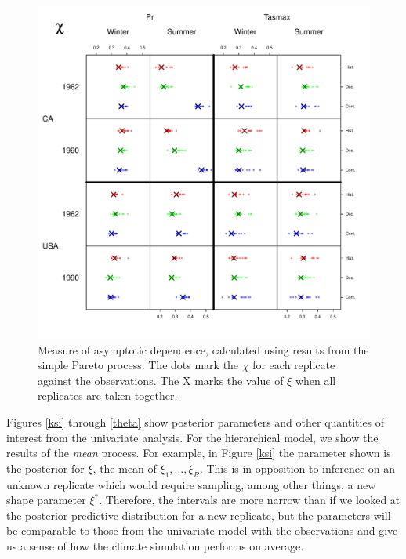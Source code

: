 \begin{figure}
\begin{center}
\includegraphics[scale=0.72]{figs/chi4.pdf}
\end{center}
\caption{Measure of asymptotic dependence, calculated using results from the simple Pareto process. The dots mark the $\chi$ for each replicate against the observations. The X marks the value of $\xi$ when all replicates are taken together.}
\label{chi}
\end{figure}


Figures \ref{ksi} through \ref{theta} show posterior parameters and other quantities of interest from the univariate analysis. For the hierarchical model, we show the results of the \emph{mean} process. For example, in Figure \ref{ksi} the parameter shown is the posterior for $\xi$, the mean of $\xi_1,\ldots,\xi_R$. This is in opposition to inference on an unknown replicate which would require sampling, among other things, a new shape parameter $\xi^*$. Therefore, the intervals are more narrow than if we looked at the posterior predictive distribution for a new replicate, but the parameters will be comparable to those from the univariate model with the observations and give us a sense of how the climate simulation performs on average.

